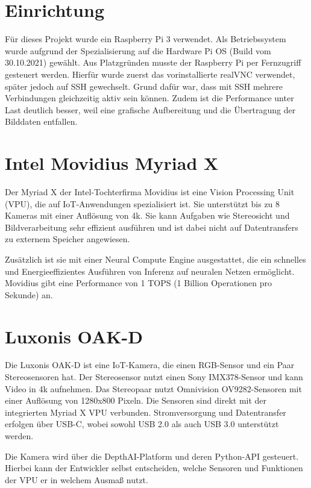 %
%     
        
    

\section{Einrichtung}
Für dieses Projekt wurde ein Raspberry Pi 3 verwendet. Als Betriebssystem wurde aufgrund der Spezialisierung auf die Hardware Pi OS (Build vom 30.10.2021) gewählt. Aus Platzgründen musste der Raspberry Pi per Fernzugriff gesteuert werden. Hierfür wurde zuerst das vorinstallierte realVNC verwendet, später jedoch auf SSH gewechselt. Grund dafür war, dass mit SSH mehrere Verbindungen gleichzeitig aktiv sein können. Zudem ist die Performance unter Last deutlich besser, weil eine grafische Aufbereitung und die Übertragung der Bilddaten entfallen. 

\section{Intel Movidius Myriad X}
Der Myriad X der Intel-Tochterfirma Movidius ist eine Vision Processing Unit (VPU), die auf IoT-Anwendungen spezialisiert ist. Sie unterstützt bis zu 8 Kameras mit einer Auflösung von 4k. Sie kann Aufgaben wie Stereosicht und Bildverarbeitung sehr effizient ausführen und ist dabei nicht auf Datentransfers zu externem Speicher angewiesen.

Zusätzlich ist sie mit einer Neural Compute Engine ausgestattet, die ein schnelles und Energieeffizientes Ausführen von Inferenz auf neuralen Netzen ermöglicht. Movidius gibt eine Performance von 1 TOPS (1 Billion Operationen pro Sekunde) an.

\section{Luxonis OAK-D}
Die Luxonis OAK-D ist eine IoT-Kamera, die einen RGB-Sensor und ein Paar Stereosensoren hat. Der Stereosensor nutzt einen Sony IMX378-Sensor und kann Video in 4k aufnehmen. Das Stereopaar nutzt Omnivision OV9282-Sensoren mit einer Auflösung von 1280x800 Pixeln.
Die Sensoren sind direkt mit der integrierten Myriad X VPU verbunden. Stromversorgung und Datentransfer erfolgen über USB-C, wobei sowohl USB 2.0 als auch USB 3.0 unterstützt werden.

Die Kamera wird über die DepthAI-Platform und deren Python-API gesteuert. Hierbei kann der Entwickler selbst entscheiden, welche Sensoren und Funktionen der VPU er in welchem Ausmaß nutzt.

